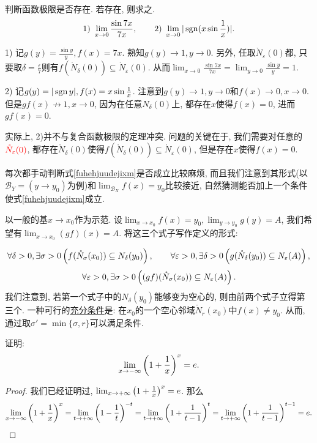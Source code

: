 \begin{example}
	判断函数极限是否存在. 若存在, 则求之. $$1)~\lim_{x\to 0} \frac{\sin 7x}{7x}, \qquad 2)~\lim_{x \to 0} |\operatorname{sgn} (x\sin \frac{1}{x})|.$$
\end{example}
\begin{solution}
	1) 记$g(y)=\frac{\sin y}{y}, f(x)=7x$. 熟知$g(y) \to 1, y \to 0$. 另外, 任取$\mathring{N}_{\varepsilon}(0)$都, 只要取$\delta = \frac{\varepsilon}{7}$则有$f(\mathring{N}_{\delta}(0)) \subseteq \mathring{N}_{\varepsilon}(0)$. 从而$\lim_{x\to 0} \frac{\sin 7x}{7x} = \lim_{y\to 0} \frac{\sin y}{y} = 1$. 
	
	2) 记$g(y) = |\operatorname{sgn} y|, f(x) = x\sin \frac{1}{x}$. 注意到$g(y) \to 1, y \to 0$和$f(x) \to 0, x \to 0$. 但是$gf(x) \nrightarrow 1, x \to 0$, 因为在任意$N_{\delta} (0)$上, 都存在$x$使得$f(x)=0$, 进而$gf(x)=0$. 
\end{solution}
\begin{remark}
	实际上, 2)并不与复合函数极限的定理冲突. 问题的关键在于, 我们需要对任意的$\color{red} \mathring{N}_{\varepsilon} (0)$, 都存在$\mathring{N}_{\delta} (0)$使得$f(\mathring{N}_{\delta} (0)) \subseteq \mathring{N}_{\varepsilon} (0)$, 但是存在$x$使得$f(x)=0$. 
\end{remark}

每次都手动判断式\ref{fuhehjuudejixm}是否成立比较麻烦, 而且我们注意到其形式(以$\mathcal{B}_Y = (y \to y_0)$为例)和$\lim_{\mathcal{B}_X} f(x) = y_0$比较接近, 自然猜测能否加上一个条件使式\ref{fuhehjuudejixm}成立. 

以一般的基$x\to x_0$作为示范. 设$\lim_{x \to x_0} f(x) = y_0, \lim_{y \to y_0} g(y) = A$, 我们希望有$\lim_{x \to x_0} (gf)(x) = A$. 将这三个式子写作定义的形式: 

$$\forall \delta >0, \exists \sigma >0 \left( f(\mathring{N}_{\sigma} (x_0)) \subseteq N_{\delta} (y_0) \right),\qquad \forall \varepsilon >0, \exists \delta >0 \left( g(\mathring{N}_{\delta} (y_0)) \subseteq N_{\varepsilon} (A) \right),$$
$$\forall \varepsilon >0, \exists \sigma >0 \left( (gf)(\mathring{N}_{\sigma} (x_0)) \subseteq N_{\varepsilon} (A) \right).$$ 
我们注意到, 若第一个式子中的$N_{\delta} (y_0)$能够变为空心的, 则由前两个式子立得第三个. 一种可行的\underline{充分条件}是: 在$x_0$的一个空心邻域$\mathring{N}_{r}(x_0)$中$f(x) \neq y_0$. 从而, 通过取$\sigma ' =\min \{\sigma , r\}$可以满足条件. 

\begin{example}
	证明: $$\lim_{x\to -\infty} \left( 1+\frac{1}{x} \right)^x = e.$$
\end{example}
\begin{proof}
	我们已经证明过, $\lim_{x\to +\infty} \left( 1+\frac{1}{x} \right)^x = e$. 那么$$\lim_{x\to -\infty} \left( 1+\frac{1}{x} \right)^x = \lim_{t\to +\infty} \left( 1-\frac{1}{t} \right)^{-t} = \lim_{t\to +\infty} \left( 1+\frac{1}{t-1} \right)^{t} = \lim_{t\to +\infty} \left( 1+\frac{1}{t-1} \right)^{t-1} = e. $$
\end{proof}

